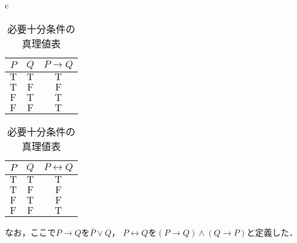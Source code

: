 \begin{table}[htbp]
  \begin{center}
    \begin{tabular}{c}
      \begin{minipage}{0.5\hsize}
        \begin{center}
          \caption{「含意」の真理値表}
          \label{fig:「含意」の真理値表}
          \begin{tabular}{|c|c|c|} \hline
            $P$           & $Q$          & $P \to Q$      \\ \hline
            $\mathrm{T}$  & $\mathrm{T}$ & $\mathrm{T}$    \\ \hline
            $\mathrm{T} $ & $\mathrm{F}$ & $\mathrm{F}$    \\ \hline
            $\mathrm{F} $ & $\mathrm{T}$ & $\mathrm{T} $   \\  \hline
            $\mathrm{F}$  & $\mathrm{F}$ & $\mathrm{T}$   \\ \hline
          \end{tabular}
        \end{center}
      \end{minipage}

      \begin{minipage}{0.5\hsize}
        \begin{center}
          \caption{必要十分条件の真理値表}
          \label{fig:必要十分条件の真理値表}
          \begin{tabular}{|c|c|c|} \hline
            $P$           & $Q$          & $P \leftrightarrow Q$      \\ \hline
            $\mathrm{T}$  & $\mathrm{T}$ & $\mathrm{T}$    \\ \hline
            $\mathrm{T} $ & $\mathrm{F}$ & $\mathrm{F}$    \\ \hline
            $\mathrm{F} $ & $\mathrm{T}$ & $\mathrm{F} $   \\  \hline
            $\mathrm{F}$  & $\mathrm{F}$ & $\mathrm{T}$   \\ \hline
          \end{tabular}
        \end{center}
      \end{minipage}
    \end{tabular}
  \end{center}
\end{table}

なお，ここで$P \to Q$を$\overline{P} \lor Q$，
$P \leftrightarrow Q$を$(P \to Q) \land (Q \to P)$と定義した．

